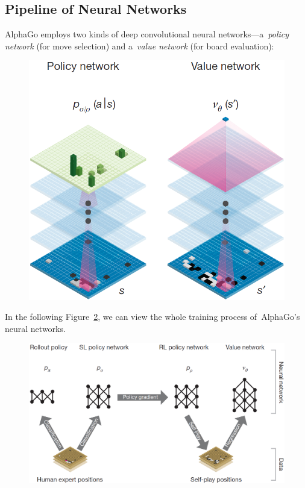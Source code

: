 \subsection{Pipeline of Neural Networks}

AlphaGo employs two kinds of deep convolutional neural networks---a~\emph{policy network} (for move selection) and a~\emph{value network} (for board evaluation):
\begin{figure}[H]
  \centering
  \includegraphics[width=.5\textwidth]{../img/policy_and_value_network.png}
  \label{fig:policy_vs_value_nets}
\end{figure}

In the following Figure~\ref{fig:neural_nets_pipeline}, we can view the whole training process of~AlphaGo's neural networks.
\begin{figure}[H]
  \centering
  \includegraphics[width=.7\textwidth]{../img/neural_nets_pipeline.png}
  \label{fig:neural_nets_pipeline}
\end{figure}

